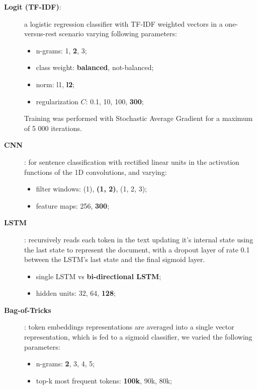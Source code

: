\documentclass[11pt,a4paper]{article}
\begin{document}
\begin{description}

\item[\textbf{Logit (TF-IDF)}:] a logistic regression classifier with TF-IDF
weighted vectors in a one-versus-rest scenario varying following parameters:

\begin{itemize}
\item n-grams: 1, \textbf{2}, 3;
\item class weight: \textbf{balanced}, not-balanced;
\item norm: l1, \textbf{l2};
\item regularization $C$: 0.1, 10, 100, \textbf{300};
\end{itemize}

Training was performed with Stochastic Average Gradient for a maximum of 5 000 iterations.

\item[\textbf{CNN}]\cite{kim-2014-convolutional}: for sentence classification with rectified linear units in
the activation functions of the 1D convolutions, and varying:

\begin{itemize}
\item filter windows: (1), \textbf{(1, 2)}, (1, 2, 3);
\item feature maps: 256, \textbf{300};
\end{itemize}

\item[\textbf{LSTM}]\cite{Hochreiter:1997:LSM:1246443.1246450}: recursively reads each token in the text updating it's
internal state using the last state to represent the document, with a dropout
layer of rate 0.1 between the LSTM's last state and the final sigmoid layer.

\begin{itemize}
\item single LSTM vs \textbf{bi-directional LSTM};
\item hidden units: 32, 64, \textbf{128};
\end{itemize}

\item[\textbf{Bag-of-Tricks}]\cite{joulin-etal-2017-bag}: token embeddings representations are averaged into
a single vector representation, which is fed to a sigmoid classifier, we varied
the following parameters:

\begin{itemize}
\item n-grams: \textbf{2}, 3, 4, 5;
\item top-k most frequent tokens: \textbf{100k}, 90k, 80k;
\end{itemize}

\end{description}
\end{document}
